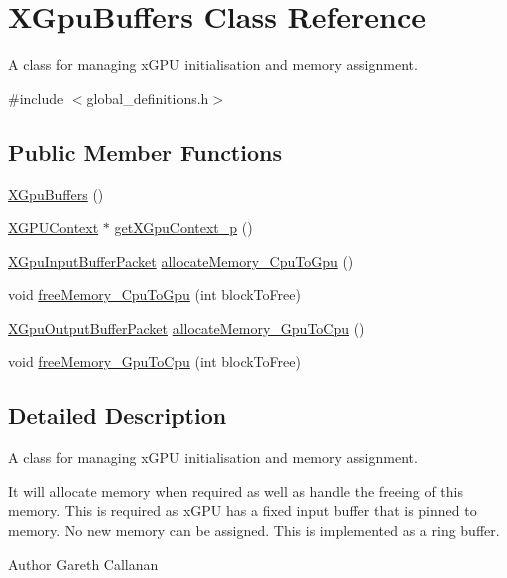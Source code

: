 \hypertarget{class_x_gpu_buffers}{}\section{X\+Gpu\+Buffers Class Reference}
\label{class_x_gpu_buffers}


A class for managing x\+G\+PU initialisation and memory assignment.  




{\ttfamily \#include $<$global\+\_\+definitions.\+h$>$}

\subsection*{Public Member Functions}
\begin{DoxyCompactItemize}
\item 
\hyperlink{class_x_gpu_buffers_a9b0204add611b87d28f16abaefd34a97}{X\+Gpu\+Buffers} ()
\item 
\hyperlink{struct_x_g_p_u_context_struct}{X\+G\+P\+U\+Context} $\ast$ \hyperlink{class_x_gpu_buffers_a31b3bc97c1aebce9976dc34e61ec17b6}{get\+X\+Gpu\+Context\+\_\+p} ()
\item 
\hyperlink{global__definitions_8h_aca3be2a33f2e7a79e14ba4a3d6f77268}{X\+Gpu\+Input\+Buffer\+Packet} \hyperlink{class_x_gpu_buffers_aed6b95cda711b28a00a4f84b712dbf28}{allocate\+Memory\+\_\+\+Cpu\+To\+Gpu} ()
\item 
void \hyperlink{class_x_gpu_buffers_a94a38505825ad378a8d85464ef5bd582}{free\+Memory\+\_\+\+Cpu\+To\+Gpu} (int block\+To\+Free)
\item 
\hyperlink{global__definitions_8h_a7919954aecf9a2c4521f0af7c1109498}{X\+Gpu\+Output\+Buffer\+Packet} \hyperlink{class_x_gpu_buffers_a4bc0ace0831b97092615cbafeca5f5c5}{allocate\+Memory\+\_\+\+Gpu\+To\+Cpu} ()
\item 
void \hyperlink{class_x_gpu_buffers_a22d2f3ee3b7fd100369bee61cfcf5b78}{free\+Memory\+\_\+\+Gpu\+To\+Cpu} (int block\+To\+Free)
\end{DoxyCompactItemize}


\subsection{Detailed Description}
A class for managing x\+G\+PU initialisation and memory assignment. 

It will allocate memory when required as well as handle the freeing of this memory. This is required as x\+G\+PU has a fixed input buffer that is pinned to memory. No new memory can be assigned. This is implemented as a ring buffer. \begin{DoxyAuthor}{Author}
Gareth Callanan 
\end{DoxyAuthor}


